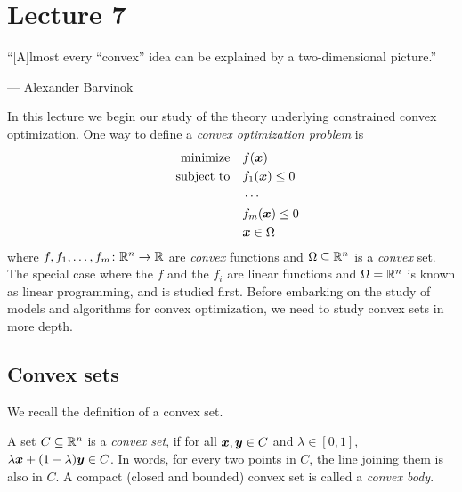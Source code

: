 %
%
% 


\chapter*{Lecture 7}
\addtocounter{chapter}{7}
\addtocounter{section}{0}

\epigraph{``[A]lmost every ``convex'' idea can be explained by a two-dimensional picture.''}{--- \textup{Alexander Barvinok}}

In this lecture we begin our study of the theory underlying constrained convex optimization. One way to define a {\em convex optimization problem} is
\begin{align*}
\begin{split}
 \text{minimize}\quad & f(\bm{x})\\
 \quad\text{subject to}\quad & f_1(\bm{x})\leq 0\\
 & \cdots \\
 & f_m(\bm{x})\leq 0\\
 & \bm{x}\in \Omega
 \end{split}
\end{align*}
where $f,f_1,\dots,f_m\colon \mathbb{R}^n\to \mathbb{R}$ are {\em convex} functions and $\Omega\subseteq \mathbb{R}^n$ is a {\em convex} set. The special case where the $f$ and the $f_i$ are linear functions and $\Omega=\mathbb{R}^n$ is known as linear programming, and is studied first. Before embarking on the study of models and algorithms for convex optimization, we need to study convex sets in more depth.

\section{Convex sets}
We recall the definition of a convex set.
\begin{definition}
 A set $C\subseteq \mathbb{R}^n$ is a {\em convex set}, if for all $\bm{x},\bm{y}\in C$ and $\lambda\in [0,1]$, $\lambda\bm{x}+(1-\lambda)\bm{y}\in C$. In words, for every two points in $C$, the line joining them is also in $C$. A compact (closed and bounded) convex set is called a {\em convex body}.
\end{definition}

